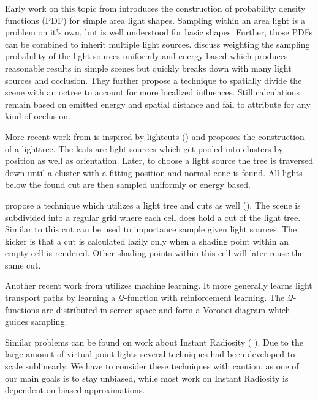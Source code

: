 Early work on this topic from \cite{Shirley:1996:MCT:226150.226151} introduces the construction of probability density functions (PDF) for simple area light shapes. Sampling within an area light is a problem on it's own, but is well understood for basic shapes. Further, those PDFs can be combined to inherit multiple light sources. \cite{Shirley:1996:MCT:226150.226151} discuss weighting the sampling probability of the light sources uniformly and energy based which produces reasonable results in simple scenes but quickly breaks down with many light sources and occlusion. They further propose a technique to spatially divide the scene with an octree to account for more localized influences. Still calculations remain based on emitted energy and spatial distance and fail to attribute for any kind of occlusion.

More recent work from \cite{Estevez:2017:ISM:3084363.3085028} is inspired by lightcuts (\cite{Walter2005LightcutsAS}) and proposes the construction of a lighttree. The leafs are light sources which get pooled into clusters by position as well as orientation. Later, to choose a  light source the tree is traversed down until a cluster with a fitting position and normal cone is found. All lights below the found cut are then sampled uniformly or energy based.

\cite{Vevoda:2016:ADI:3005274.3005283} propose a technique which utilizes a light tree and cuts as well (\cite{Walter2005LightcutsAS}). The scene is subdivided into a regular grid where each cell does hold a cut of the light tree. Similar to \cite{Estevez:2017:ISM:3084363.3085028} this cut can be used to importance sample given light sources. The kicker is that a cut is calculated lazily only when a shading point within an empty cell is rendered. Other shading points within this cell will later reuse the same cut.

Another recent work from \cite{DBLP:journals/corr/DahmK17} utilizes machine learning. It more generally learns light transport paths by learning a $\mathcal{Q}$-function with reinforcement learning. The $\mathcal{Q}$-functions are distributed in screen space and form a Voronoi diagram which guides sampling.

Similar problems can be found on work about Instant Radiosity (\cite{keller1997instant} \cite{Walter2005LightcutsAS} \cite{dachsbacher2014scalable}). Due to the large amount of virtual point lights several techniques had been developed to scale sublinearly. We have to consider these techniques with caution, as one of our main goals is to stay unbiased, while most work on Instant Radiosity is dependent on biased approximations.

